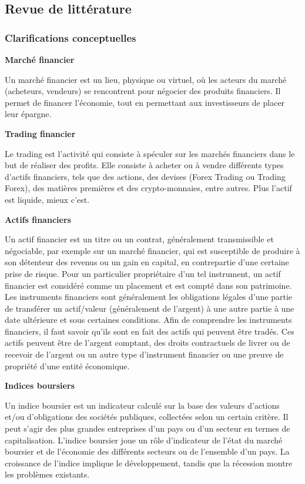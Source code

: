 \subsection{Revue de littérature}   

\subsubsection{Clarifications conceptuelles}
\begin{center}
    \textbf{Marché financier}
\end{center}
Un marché financier est un lieu, physique ou virtuel, où les acteurs du marché (acheteurs, vendeurs)
 se rencontrent pour négocier des produits financiers. Il permet de financer l'économie, tout en
 permettant aux investisseurs de placer leur épargne.

\begin{center}
    \textbf{Trading financier}
\end{center}
Le trading est l'activité qui consiste à spéculer sur les marchés financiers dans le but de 
réaliser des profits. Elle consiste à acheter ou à vendre différents types d'actifs financiers,
 tels que des actions, des devises (Forex Trading ou Trading Forex), des matières premières et
  des crypto-monnaies, entre autres. Plus l'actif est liquide, mieux c'est.

\begin{center}
    \textbf{Actifs financiers}
\end{center}
Un actif financier est un titre ou un contrat, généralement transmissible et négociable, par 
exemple sur un marché financier, qui est susceptible de produire à son détenteur des revenus ou 
un gain en capital, en contrepartie d'une certaine prise de risque. Pour un particulier 
propriétaire d'un tel instrument, un actif financier est considéré comme un placement et 
est compté dans son patrimoine. Les instruments financiers sont généralement les obligations 
légales d'une partie de transférer un actif/valeur (généralement de l'argent) à une autre partie à
 une date ultérieure et sous certaines conditions. Afin de comprendre les instruments financiers, 
 il faut savoir qu'ils sont en fait des actifs qui peuvent être tradés. Ces actifs peuvent être 
 de l'argent comptant, des droits contractuels de livrer ou de recevoir de l'argent ou un autre 
 type d'instrument financier ou une preuve de propriété d'une entité économique.

\begin{center}
    \textbf{Indices boursiers}
\end{center}
Un indice boursier est un indicateur calculé sur la base des valeurs d'actions et/ou d'obligations
 des sociétés publiques, collectées selon un certain critère. Il peut s'agir des plus grandes 
 entreprises d'un pays ou d'un secteur en termes de capitalisation. L'indice boursier joue un 
 rôle d'indicateur de l'état du marché boursier et de l'économie des différents secteurs ou de 
 l'ensemble d'un pays. La croissance de l'indice implique le développement, tandis que la récession 
 montre les problèmes existants.


